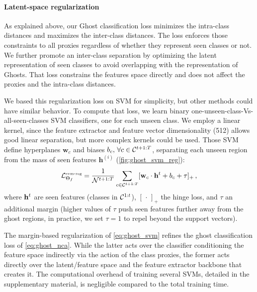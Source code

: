


\label{sec:ghost_svm}
\paragraph{Latent-space regularization}
As explained above, our Ghost classification loss minimizes the intra-class distances and maximizes
the inter-class distances. The loss enforces those constraints to all proxies regardless of whether
they represent seen classes or not. We further promote an inter-class separation by optimizing the
latent representation of seen classes to avoid overlapping with the representation of Ghosts. That
loss constrains the features space directly and does not affect the proxies and the intra-class
distances.

We based this regularization loss on SVM \citep{cortes1995svm} for simplicity, but other methods
could have similar behavior. To compute that loss, we learn binary
one-unseen-class-Vs-all-seen-classes SVM classifiers, one for each unseen class. We employ a linear
kernel, since the feature extractor and feature vector dimensionality (512) allows good linear
separation, but more complex kernels could be used. Those \acs{SVM} define hyperplanes
$\mathbf{w}_c$ and biases $b_c,\, \forall c \in \mathcal{C}^{t+1:T}$, separating each unseen region from the
mass of seen features $\mathbf{h}^{(i)}$ (\autoref{fig:ghost_svm_reg}):
%
\begin{equation}
    \mathcal{L}^\text{\tiny{svm-reg}}_{\Theta_f} = \frac{1}{\mathcal{N}^{t+1:T}} \sum_{c\in \mathcal{C}^{t+1:T}} [\mathbf{w}_c \cdot \mathbf{h}^t + b_c + \tau]_+\,,
    \label{eq:ghost_svm}
\end{equation}
%
\noindent where $\mathbf{h}^t$ are seen features (classes in $\mathcal{C}^{1:t}$), $[\,\cdot\,]_+$ the hinge loss,
and $\tau$ an additional margin (higher values of $\tau$ push seen features further away from the
ghost regions, in practice, we set $\tau=1$ to repel beyond the support vectors).

The margin-based regularization of \autoref{eq:ghost_svm} refines the ghost classification loss of
\autoref{eq:ghost_nca}. While the latter acts over the classifier conditioning the feature space
indirectly via the action of the class proxies, the former acts directly over the latent/feature
space and the feature extractor backbone that creates it. The computational overhead of training
several SVMs, detailed in the supplementary material, is negligible compared to the total training
time.

